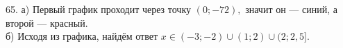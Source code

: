 65. а) Первый график проходит через точку $(0;-72),$ значит он --- синий, а второй --- красный.\\
б) Исходя из графика, найдём ответ $x\in(-3;-2)\cup(1;2)\cup(2;2,5].$\\
